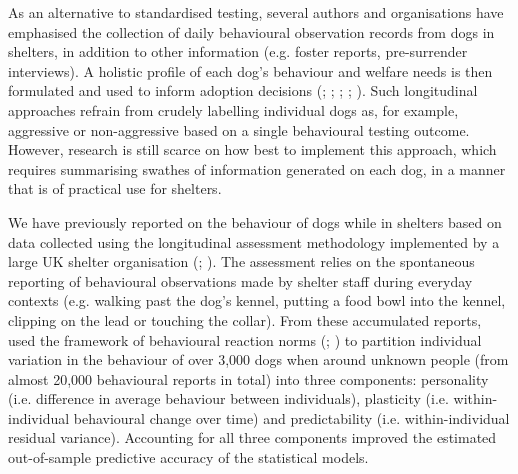 \documentclass[12pt]{article}
\begin{document}
As an alternative to standardised testing, several authors and organisations have emphasised the collection of daily behavioural observation records from dogs in shelters, in addition to other information (e.g. foster reports, pre-surrender interviews). A holistic profile of each dog's behaviour and welfare needs is then formulated and used to inform adoption decisions (\cite{patronek2019}; \cite{ASPCA2018}; \cite{rayment2015}; \cite{mornement2015}; \cite{clay2020}). Such longitudinal approaches refrain from crudely labelling individual dogs as, for example, aggressive or non-aggressive based on a single behavioural testing outcome. However, research is still scarce on how best to implement this approach, which requires summarising swathes of information generated on each dog, in a manner that is of practical use for shelters.

We have previously reported on the behaviour of dogs while in shelters based on data collected using the longitudinal assessment methodology implemented by a large UK shelter organisation (\cite{goold2017aggressiveness}; \cite{goold2017modelling}). The assessment relies on the spontaneous reporting of behavioural observations made by shelter staff during everyday contexts (e.g. walking past the dog's kennel, putting a food bowl into the kennel, clipping on the lead or touching the collar). From these accumulated reports, \textcite{goold2017modelling} used the framework of behavioural reaction norms (\cite{dingemanse2010}; \cite{cleasby2015}) to partition individual variation in the behaviour of over 3,000 dogs when around unknown people (from almost 20,000 behavioural reports in total) into three components: personality (i.e. difference in average behaviour between individuals), plasticity (i.e. within-individual behavioural change over time) and predictability (i.e. within-individual residual variance). Accounting for all three components improved the estimated out-of-sample predictive accuracy of the statistical models.
\end{document}
